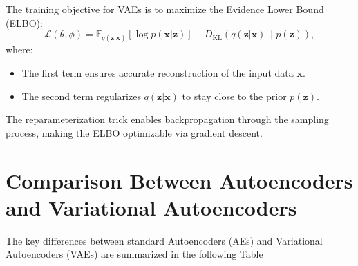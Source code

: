 \documentclass[a4paper,12pt]{article}
\begin{document}
The training objective for VAEs is to maximize the Evidence Lower Bound (ELBO):
\[
\mathcal{L}(\theta, \phi) = \mathbb{E}_{q(\mathbf{z}|\mathbf{x})} \left[ \log p(\mathbf{x}|\mathbf{z}) \right] - D_{\text{KL}} \left( q(\mathbf{z}|\mathbf{x}) \| p(\mathbf{z}) \right),
\]
where:
\begin{itemize}
    \item The first term ensures accurate reconstruction of the input data $\mathbf{x}$.
    \item The second term regularizes $q(\mathbf{z}|\mathbf{x})$ to stay close to the prior $p(\mathbf{z})$.
\end{itemize}

The reparameterization trick enables backpropagation through the sampling process, making the ELBO optimizable via gradient descent.


\section{Comparison Between Autoencoders and Variational Autoencoders}

The key differences between standard Autoencoders (AEs) and Variational Autoencoders (VAEs) are summarized in the following Table
\end{document}
